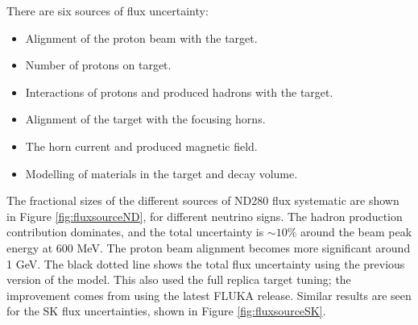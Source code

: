 There are six sources of flux uncertainty:

\begin{itemize}

\item Alignment of the proton beam with the target.

\item Number of protons on target.

\item Interactions of protons and produced hadrons with the target.

\item Alignment of the target with the focusing horns.

\item The horn current and produced magnetic field.

\item Modelling of materials in the target and decay volume.

\end{itemize}

The fractional sizes of the different sources of ND280 flux systematic are shown in Figure \ref{fig:fluxsourceND}, for different neutrino signs. The hadron production contribution dominates, and the total uncertainty is $\sim10\%$ around the beam peak energy at 600 MeV. The proton beam alignment becomes more significant around 1 GeV. The black dotted line shows the total flux uncertainty using the previous version of the model. This also used the full replica target tuning; the improvement comes from using the latest FLUKA\cite{fluka} release. Similar results are seen for the SK flux uncertainties, shown in Figure \ref{fig:fluxsourceSK}.

